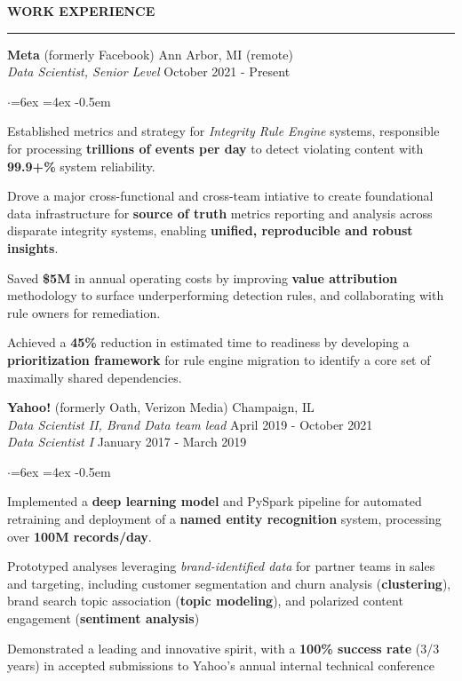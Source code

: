 \documentclass[11pt]{article}
\newenvironment{rSection}[1]{ %
  \sectionskip
  \MakeUppercase{\textbf{#1}} %
  \sectionlineskip
  \hrule %
  \begin{list}{}{ %
    \setlength{\leftmargin}{1.5em} %
  }
  \item[]
}{
  \end{list}
}
\def\sectionlineskip{\smallskip} %
\def\sectionskip{\smallskip} %
\begin{document}
\begin{rSection}{Work Experience}

{\bfseries Meta} (formerly Facebook) \hfill Ann Arbor, MI (remote) \\
{\em \hspace*{2ex} Data Scientist, Senior Level} \hfill October 2021 - Present  %

\begin{list}{$\cdot$}{\leftmargin=6ex \rightmargin=4ex}
  \itemsep -0.5em \vspace{-0.5em}
  \item Established metrics and strategy for \textit{Integrity Rule Engine} systems, responsible for processing \textbf{trillions of events per day} to detect violating content with \textbf{99.9+\%} system reliability.
  \item Drove a major cross-functional and cross-team intiative to create foundational data infrastructure for \textbf{source of truth} metrics reporting and analysis across disparate integrity systems, enabling \textbf{unified, reproducible and robust insights}.
  \item Saved \textbf{\$5M} in annual operating costs by improving \textbf{value attribution} methodology to surface underperforming detection rules, and collaborating with rule owners for remediation.
  \item Achieved a \textbf{45\%} reduction in estimated time to readiness by developing a \textbf{prioritization framework} for rule engine migration to identify a core set of maximally shared dependencies.
\end{list}

{\bfseries Yahoo!} (formerly Oath, Verizon Media) \hfill Champaign, IL \\
{\em \hspace*{2ex} Data Scientist II, Brand Data team lead} \hfill April 2019 - October 2021 \\
{\em \hspace*{2ex} Data Scientist I} \hfill January 2017 - March 2019

\begin{list}{$\cdot$}{\leftmargin=6ex \rightmargin=4ex} %
   \itemsep -0.5em \vspace{-0.5em} %
   \item Implemented a \textbf{deep learning model} and PySpark pipeline for automated retraining and deployment of a \textbf{named entity recognition} system, processing over \textbf{100M records/day}.
   \item Prototyped analyses leveraging \textit{brand-identified data} for partner teams in sales and targeting, including customer segmentation and churn analysis (\textbf{clustering}), brand search topic association (\textbf{topic modeling}), and polarized content engagement (\textbf{sentiment analysis})
   \item Demonstrated a leading and innovative spirit, with a \textbf{100\% success rate} (3/3 years) in accepted submissions to Yahoo's annual internal technical conference
\end{list}

\end{rSection}
\end{document}
